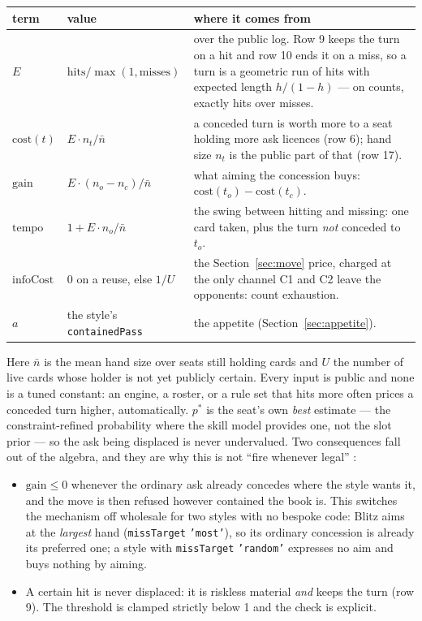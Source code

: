 \documentclass[11pt]{article}
\newcommand{\code}[1]{\texttt{#1}}
\begin{document}
\begin{center}
\small
\begin{tabular}{@{}l l p{}@{}}
\toprule
term & value & where it comes from \\
\midrule
$E$ & $\mathrm{hits}/\max(1,\mathrm{misses})$ &
  over the public log. Row 9 keeps the turn on a hit and row 10 ends it on a
  miss, so a turn is a geometric run of hits with expected length $h/(1-h)$
  --- on counts, exactly hits over misses. \\
$\mathrm{cost}(t)$ & $E \cdot n_{t}/\bar{n}$ &
  a conceded turn is worth more to a seat holding more ask licences (row 6);
  hand size $n_{t}$ is the public part of that (row 17). \\
$\mathrm{gain}$ & $E \cdot (n_{o}-n_{c})/\bar{n}$ &
  what aiming the concession buys: $\mathrm{cost}(t_o)-\mathrm{cost}(t_c)$. \\
$\mathrm{tempo}$ & $1 + E \cdot n_{o}/\bar{n}$ &
  the swing between hitting and missing: one card taken, plus the turn
  \emph{not} conceded to $t_o$. \\
$\mathrm{infoCost}$ & $0$ on a reuse, else $1/U$ &
  the Section~\ref{sec:move} price, charged at the only channel C1 and C2
  leave the opponents: count exhaustion. \\
$a$ & the style's \code{containedPass} &
  the appetite (Section~\ref{sec:appetite}). \\
\bottomrule
\end{tabular}
\end{center}

\noindent
Here $\bar{n}$ is the mean hand size over seats still holding cards and $U$
the number of live cards whose holder is not yet publicly certain. Every input
is public and none is a tuned constant: an engine, a roster, or a rule set
that hits more often prices a conceded turn higher, automatically. $p^{*}$ is
the seat's own \emph{best} estimate --- the constraint-refined probability
where the skill model provides one, not the slot prior --- so the ask being
displaced is never undervalued. Two consequences fall out of the algebra, and
they are why this is not ``fire whenever legal'' \cite{styles}:

\begin{itemize}
\item $\mathrm{gain} \le 0$ whenever the ordinary ask already concedes where
the style wants it, and the move is then refused however contained the book
is. This switches the mechanism off wholesale for two styles with no bespoke
code: Blitz aims at the \emph{largest} hand (\code{missTarget} \code{'most'}),
so its ordinary concession is already its preferred one; a style with
\code{missTarget} \code{'random'} expresses no aim and buys nothing by aiming.
\item A certain hit is never displaced: it is riskless material \emph{and}
keeps the turn (row 9). The threshold is clamped strictly below 1 and the
check is explicit.
\end{itemize}
\end{document}
